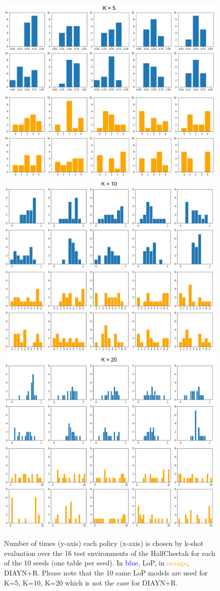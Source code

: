 \begin{figure}[h!]
\centering
\includegraphics[width=0.55\linewidth]{images/hist_k5_halfcheetah_bis.png} \\
\includegraphics[width=0.55\linewidth]{images/hist_k10_halfcheetah.png} \\
\includegraphics[width=0.55\linewidth]{images/hist_k20_halfcheetah.png}
\caption{Number of times (y-axis) each policy (x-axis) is chosen by k-shot evaluation over the 16 test environments of the HalfCheetah for each of the 10 seeds (one table per seed). In \textcolor{blue}{blue}, LoP, in \textcolor{orange}{orange}, DIAYN+R. Please note that the 10 same LoP models are used for K=5, K=10, K=20 which is not the case for DIAYN+R.}
\label{fig:histograms}
\end{figure}

